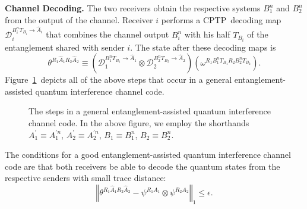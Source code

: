 \documentclass[aps,11pt,twoside,letterpaper]{article}
\begin{document}
		\textbf{Channel Decoding.} The two receivers obtain the respective systems
		$B_{1}^{n}$ and $B_{2}^{n}$ from the output of the channel. Receiver $i$
		performs a CPTP\ decoding map $\mathcal{D}_{i}^{B_{i}^{n}T_{B_{i}}%
		\rightarrow\hat{A}_{i}}$ that combines the channel output $B_{i}^{n}$ with his
		half $T_{B_{i}}$ of the entanglement shared with sender $i$. The state after
		these decoding maps is%
		\[
		\theta^{R_{1}\hat{A}_{1}R_{2}\hat{A}_{2}}\equiv(\mathcal{D}_{1}^{B_{1}%
		^{n}T_{B_{1}}\rightarrow\hat{A}_{1}}\otimes\mathcal{D}_{2}^{B_{2}^{n}T_{B_{2}%
		}\rightarrow\hat{A}_{2}})(\omega^{R_{1}B_{1}^{n}T_{B_{1}}R_{2}B_{2}%
		^{n}T_{B_{2}}}).
		\]
		Figure~\ref{fig:interference-protocol}\ depicts all of the above steps that
		occur in a general entanglement-assisted quantum interference channel code.%
		\begin{figure}
		[ptb]
		\begin{center}
		\caption{The steps in a general entanglement-assisted quantum interference
		channel code. In the above figure, we employ the shorthands $A_{1}^{\prime
		}\equiv A_{1}^{\prime n}$, $A_{2}^{\prime}\equiv A_{2}^{\prime n}$,
		$B_{1}\equiv B_{1}^{n}$, $B_{2}\equiv B_{2}^{n}$.}%
		\label{fig:interference-protocol}%
		\end{center}
		\end{figure}

		
		The conditions for a good entanglement-assisted quantum interference channel
		code are that both receivers be able to decode the quantum states from the
		respective senders with small trace distance:%
		\[
		\left\Vert \theta^{R_{1}\hat{A}_{1}R_{2}\hat{A}_{2}}-\psi^{R_{1}A_{1}}%
		\otimes\psi^{R_{2}A_{2}}\right\Vert _{1}\leq\epsilon.
		\]
\end{document}
